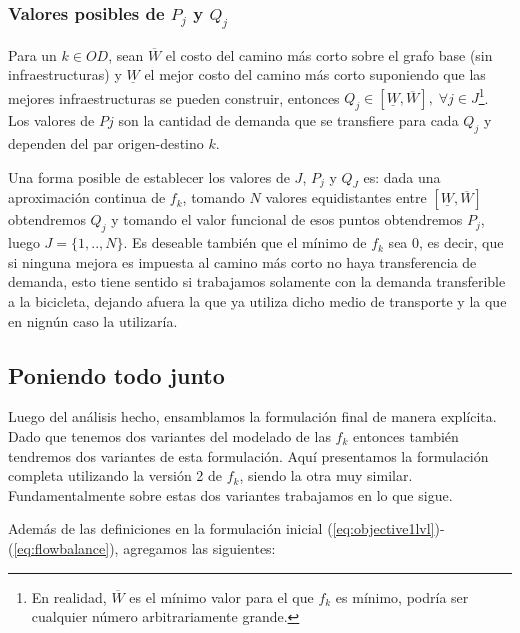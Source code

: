\documentclass{article}
\begin{document}
  \subsubsection{Valores posibles de $P_j$ y $Q_j$}

  Para un $k \in OD$, sean $\overline{W}$ el costo del camino más corto sobre el grafo base (sin infraestructuras) y $\underline{W}$ el mejor costo del camino más corto suponiendo que las mejores infraestructuras se pueden construir, entonces $Q_j \in [\underline{W}, \overline{W}],\; \forall j \in J$\footnote{En realidad, $\overline{W}$ es el mínimo valor para el que $f_k$ es mínimo, podría ser cualquier número arbitrariamente grande.}. Los valores de $Pj$ son la cantidad de demanda que se transfiere para cada $Q_j$ y dependen del par origen-destino $k$.

  Una forma posible de establecer los valores de $J$, $P_j$ y $Q_J$ es: dada una aproximación continua de $f_k$, tomando $N$ valores equidistantes entre $[\underline{W}, \overline{W}]$ obtendremos $Q_j$ y tomando el valor funcional de esos puntos obtendremos $P_j$, luego $J=\{1,..,N\}$. Es deseable también que el mínimo de $f_k$ sea 0, es decir, que si ninguna mejora es impuesta al camino más corto no haya transferencia de demanda, esto tiene sentido si trabajamos solamente con la demanda transferible a la bicicleta, dejando afuera la que ya utiliza dicho medio de transporte y la que en nignún caso la utilizaría.

  \subsection{Poniendo todo junto}
  \label{sect:alltogether}

  Luego del análisis hecho, ensamblamos la formulación final de manera explícita. Dado que tenemos dos variantes del modelado de las $f_k$ entonces también tendremos dos variantes de esta formulación. Aquí presentamos la formulación completa utilizando la versión 2 de $f_k$, siendo la otra muy similar. Fundamentalmente sobre estas dos variantes trabajamos en lo que sigue.

  Además de las definiciones en la formulación inicial (\ref{eq:objective1lvl})-(\ref{eq:flowbalance}), agregamos las siguientes:
\end{document}
